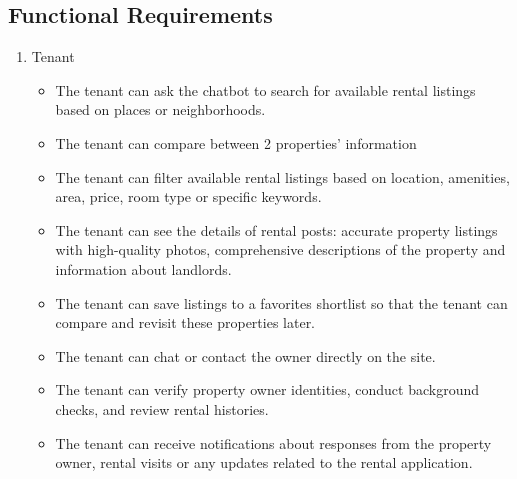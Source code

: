 \subsection{Functional Requirements}
\begin{enumerate}
    \item Tenant
    \begin{itemize}
        \item The tenant can ask the chatbot to search for available rental listings based on places or neighborhoods. 
        \item The tenant can compare between 2 properties' information
        \item The tenant can filter available rental listings based on location, amenities, area, price, room type or specific keywords.
        \item The tenant can see the details of rental posts: accurate property listings with high-quality photos, comprehensive descriptions of the property and information about landlords.
        \item The tenant can save listings to a favorites shortlist so that the tenant can compare and revisit these properties later.
        \item The tenant can chat or contact the owner directly on the site.
        \item The tenant can verify property owner identities, conduct background checks, and review rental histories.
        \item The tenant can receive notifications about responses from the property owner, rental visits or any updates related to the rental application.
    \end{itemize}
    

\end{enumerate}
